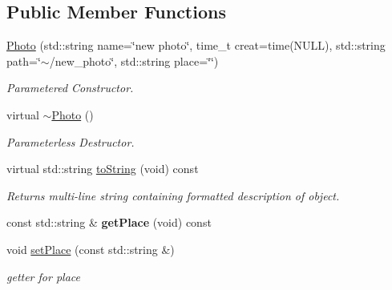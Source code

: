 \subsection*{Public Member Functions}
\begin{DoxyCompactItemize}
\item 
\hypertarget{classPhoto_a77533515f74784f105299a7fe911833a}{\hyperlink{classPhoto_a77533515f74784f105299a7fe911833a}{Photo} (std\-::string name=\char`\"{}new photo\char`\"{}, time\-\_\-t creat=time(N\-U\-L\-L), std\-::string path=\char`\"{}$\sim$/new\-\_\-photo\char`\"{}, std\-::string place=\char`\"{}\char`\"{})}\label{classPhoto_a77533515f74784f105299a7fe911833a}

\begin{DoxyCompactList}\small\item\em Parametered Constructor. \end{DoxyCompactList}\item 
virtual \hyperlink{classPhoto_adc366234be6226600360c7cbba8e7fcf}{$\sim$\-Photo} ()
\begin{DoxyCompactList}\small\item\em Parameterless Destructor. \end{DoxyCompactList}\item 
\hypertarget{classPhoto_a8be4be2bb68b6db13ec45ff3bed71481}{virtual std\-::string \hyperlink{classPhoto_a8be4be2bb68b6db13ec45ff3bed71481}{to\-String} (void) const }\label{classPhoto_a8be4be2bb68b6db13ec45ff3bed71481}

\begin{DoxyCompactList}\small\item\em Returns multi-\/line string containing formatted description of object. \end{DoxyCompactList}\item 
\hypertarget{classPhoto_a1c84436ddbf58a50b632f1ef49c1fe31}{const std\-::string \& {\bfseries get\-Place} (void) const }\label{classPhoto_a1c84436ddbf58a50b632f1ef49c1fe31}

\item 
\hypertarget{classPhoto_ae835a7d23db2b2f6b90d1efaaf034959}{void \hyperlink{classPhoto_ae835a7d23db2b2f6b90d1efaaf034959}{set\-Place} (const std\-::string \&)}\label{classPhoto_ae835a7d23db2b2f6b90d1efaaf034959}

\begin{DoxyCompactList}\small\item\em getter for place \end{DoxyCompactList}\end{DoxyCompactItemize}


